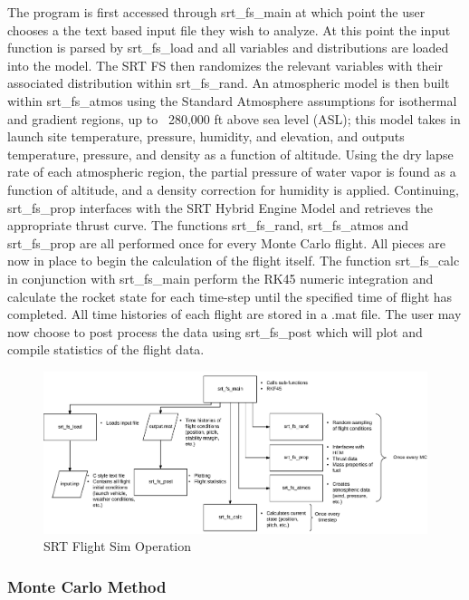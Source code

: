 \documentclass[10pt,a4paper]{article}
\begin{document}
The program is first accessed through srt\_fs\_main at which point the user chooses a the text based input file they wish to analyze. At this point the input function is parsed by srt\_fs\_load and all variables and distributions are loaded into the model. The SRT FS then randomizes the relevant variables with their associated distribution within srt\_fs\_rand. An atmospheric model is then built within srt\_fs\_atmos using the Standard Atmosphere assumptions for isothermal and gradient regions, up to ~280,000 ft above sea level (ASL); this model takes in launch site temperature, pressure, humidity, and elevation, and outputs temperature, pressure, and density as a function of altitude. Using the dry lapse rate of each atmospheric region, the partial pressure of water vapor is found as a function of altitude, and a density correction for humidity is applied. Continuing, srt\_fs\_prop interfaces with the SRT Hybrid Engine Model and retrieves the appropriate thrust curve. The functions srt\_fs\_rand, srt\_fs\_atmos and srt\_fs\_prop are all performed once for every Monte Carlo flight. All pieces are now in place to begin the calculation of the flight itself. The function srt\_fs\_calc in conjunction with srt\_fs\_main perform the RK45 numeric integration and calculate the rocket state for each time-step until the specified time of flight has completed. All time histories of each flight are stored in a .mat file. The user may now choose to post process the data using srt\_fs\_post which will plot and compile statistics of the flight data. 
\begin{figure}[h!]
	\centering
	\includegraphics[width=1.05\textwidth]{./figs/fs_flow.png}
	\caption{SRT Flight Sim Operation}
	\label{fig:fs_flow}
\end{figure}


\subsubsection{Monte Carlo Method}
\end{document}

